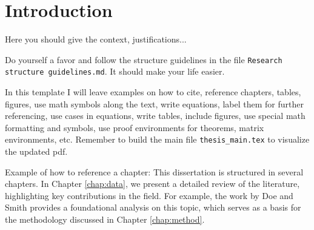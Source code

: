 \chapter{Introduction} \label{chap:intro}

Here you should give the context, justifications...

Do yourself a favor and follow the structure guidelines in the file \texttt{Research struc\-ture guidelines.md}. It should make your life easier.

In this template I will leave examples on how to cite, reference chapters, tables, figures, use math symbols along the text, write equations, label them for further referencing, use cases in equations, write tables, include figures, use special math formatting and symbols, use proof environments for theorems, matrix environments, etc. Remember to build the main file \texttt{thesis\_main.tex} to visualize the updated pdf.

Example of how to reference a chapter: This dissertation is structured in several chapters. In Chapter \ref{chap:data}, we present a detailed review of the literature, highlighting key contributions in the field. For example, the work by Doe and Smith \cite{doe0000} provides a foundational analysis on this topic, which serves as a basis for the methodology discussed in Chapter \ref{chap:method}.
